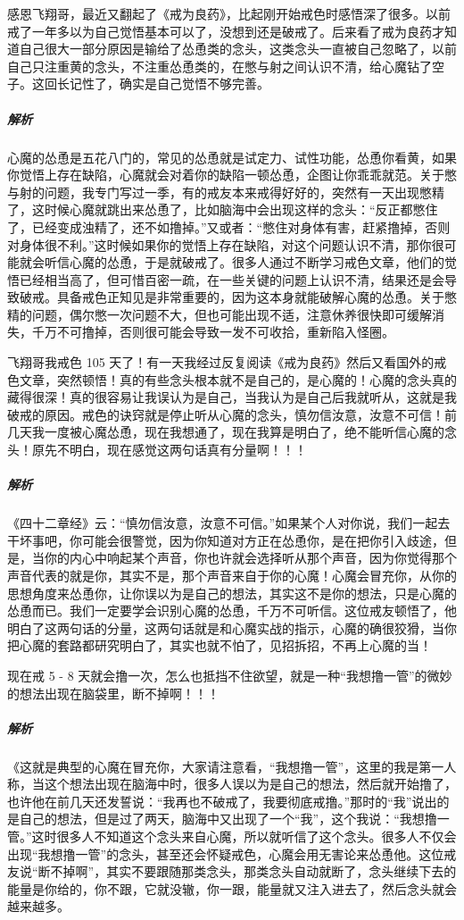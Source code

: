 \begin{case}[必须完善你的觉悟]
    感恩飞翔哥，最近又翻起了《戒为良药》，比起刚开始戒色时感悟深了很多。以前戒了一年多以为自己觉悟基本可以了，没想到还是破戒了。后来看了戒为良药才知道自己很大一部分原因是输给了怂恿类的念头，这类念头一直被自己忽略了，以前自己只注重黄的念头，不注重怂恿类的，在憋与射之间认识不清，给心魔钻了空子。这回长记性了，确实是自己觉悟不够完善。
    \subparagraph{解析} 心魔的怂恿是五花八门的，常见的怂恿就是试定力、试性功能，怂恿你看黄，如果你觉悟上存在缺陷，心魔就会对着你的缺陷一顿怂恿，企图让你乖乖就范。关于憋与射的问题，我专门写过一季，有的戒友本来戒得好好的，突然有一天出现憋精了，这时候心魔就跳出来怂恿了，比如脑海中会出现这样的念头：“反正都憋住了，已经变成浊精了，还不如撸掉。”又或者：“憋住对身体有害，赶紧撸掉，否则对身体很不利。”这时候如果你的觉悟上存在缺陷，对这个问题认识不清，那你很可能就会听信心魔的怂恿，于是就破戒了。很多人通过不断学习戒色文章，他们的觉悟已经相当高了，但可惜百密一疏，在一些关键的问题上认识不清，结果还是会导致破戒。具备戒色正知见是非常重要的，因为这本身就能破解心魔的怂恿。关于憋精的问题，偶尔憋一次问题不大，但也可能出现不适，注意休养很快即可缓解消失，千万不可撸掉，否则很可能会导致一发不可收拾，重新陷入怪圈。
\end{case}

\begin{case}
    飞翔哥我戒色 105 天了！有一天我经过反复阅读《戒为良药》然后又看国外的戒色文章，突然顿悟！真的有些念头根本就不是自己的，是心魔的！心魔的念头真的藏得很深！真的很容易让我误认为是自己，当我认为是自己后我就听从，这就是我破戒的原因。戒色的诀窍就是停止听从心魔的念头，慎勿信汝意，汝意不可信！前几天我一度被心魔怂恿，现在我想通了，现在我算是明白了，绝不能听信心魔的念头！原先不明白，现在感觉这两句话真有分量啊！！！
    \subparagraph{解析} 《四十二章经》云：“慎勿信汝意，汝意不可信。”如果某个人对你说，我们一起去干坏事吧，你可能会很警觉，因为你知道对方正在怂恿你，是在把你引入歧途，但是，当你的内心中响起某个声音，你也许就会选择听从那个声音，因为你觉得那个声音代表的就是你，其实不是，那个声音来自于你的心魔！心魔会冒充你，从你的思想角度来怂恿你，让你误以为是自己的想法，其实这不是你的想法，只是心魔的怂恿而已。我们一定要学会识别心魔的怂恿，千万不可听信。这位戒友顿悟了，他明白了这两句话的分量，这两句话就是和心魔实战的指示，心魔的确很狡猾，当你把心魔的套路都研究明白了，其实也就不怕了，见招拆招，不再上心魔的当！
\end{case}

\begin{case}
    现在戒 5 - 8 天就会撸一次，怎么也抵挡不住欲望，就是一种“我想撸一管”的微妙的想法出现在脑袋里，断不掉啊！！！
    \subparagraph{解析} 《这就是典型的心魔在冒充你，大家请注意看，“我想撸一管”，这里的我是第一人称，当这个想法出现在脑海中时，很多人误以为是自己的想法，然后就开始撸了，也许他在前几天还发誓说：“我再也不破戒了，我要彻底戒撸。”那时的“我”说出的是自己的想法，但是过了两天，脑海中又出现了一个“我”，这个我说：“我想撸一管。”这时很多人不知道这个念头来自心魔，所以就听信了这个念头。很多人不仅会出现“我想撸一管”的念头，甚至还会怀疑戒色，心魔会用无害论来怂恿他。这位戒友说“断不掉啊”，其实不要跟随那类念头，那类念头自动就断了，念头继续下去的能量是你给的，你不跟，它就没辙，你一跟，能量就又注入进去了，然后念头就会越来越多。
\end{case}


